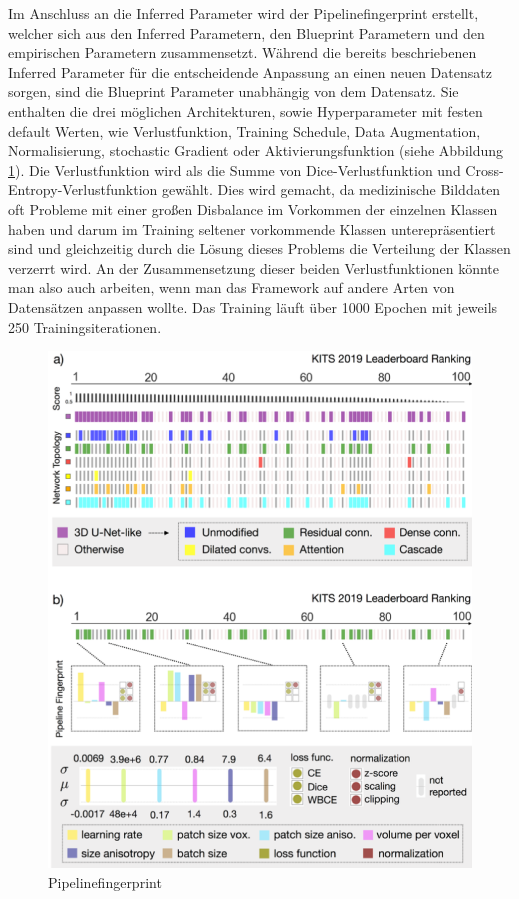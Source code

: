 Im Anschluss an die Inferred Parameter wird der Pipelinefingerprint erstellt, welcher sich aus den Inferred Parametern, den Blueprint Parametern und den empirischen Parametern zusammensetzt. Während die bereits beschriebenen Inferred Parameter für die entscheidende Anpassung an einen neuen Datensatz sorgen, sind die Blueprint Parameter unabhängig von dem Datensatz. Sie enthalten die drei möglichen Architekturen, sowie Hyperparameter mit festen default Werten, wie Verlustfunktion, Training Schedule, Data Augmentation, Normalisierung, stochastic Gradient oder  Aktivierungsfunktion (siehe Abbildung \ref{pic:nnUnet_Pipelinefingerprint}). Die Verlustfunktion wird als die Summe von Dice-Verlustfunktion und Cross-Entropy-Verlustfunktion gewählt. Dies wird gemacht, da medizinische Bilddaten oft Probleme mit einer großen Disbalance im Vorkommen der einzelnen Klassen haben und darum im Training seltener vorkommende Klassen unterepräsentiert sind und gleichzeitig durch die Lösung dieses Problems die Verteilung der Klassen verzerrt wird. An der Zusammensetzung dieser beiden Verlustfunktionen könnte man also auch arbeiten, wenn man das Framework auf andere Arten von Datensätzen anpassen wollte. Das Training läuft über 1000 Epochen mit jeweils 250 Trainingsiterationen. 

\begin{figure}[H]
	
	\centering
	\includegraphics[scale=0.5]{Pictures/nnUnet/Bild05.png}
	\caption{Pipelinefingerprint \cite{nnunetPaperB} }
	\label{pic:nnUnet_Pipelinefingerprint}
\end{figure}

